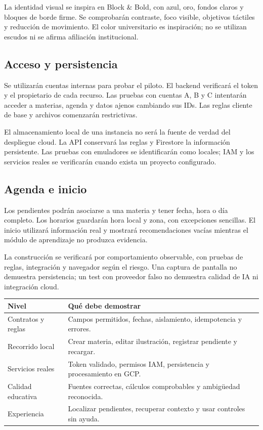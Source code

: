 La identidad visual se inspira en Block \& Bold, con azul, oro, fondos claros y bloques de borde firme. Se comprobarán contraste, foco visible, objetivos táctiles y reducción de movimiento. El color universitario es inspiración; no se utilizan escudos ni se afirma afiliación institucional.

\subsection*{Acceso y persistencia}
Se utilizarán cuentas internas para probar el piloto. El backend verificará el token y el propietario de cada recurso. Las pruebas con cuentas A, B y C intentarán acceder a materias, agenda y datos ajenos cambiando sus IDs. Las reglas cliente de base y archivos comenzarán restrictivas.

El almacenamiento local de una instancia no será la fuente de verdad del despliegue cloud. La API conservará las reglas y Firestore la información persistente. Las pruebas con emuladores se identificarán como locales; IAM y los servicios reales se verificarán cuando exista un proyecto configurado.

\subsection*{Agenda e inicio}
Los pendientes podrán asociarse a una materia y tener fecha, hora o día completo. Los horarios guardarán hora local y zona, con excepciones sencillas. El inicio utilizará información real y mostrará recomendaciones vacías mientras el módulo de aprendizaje no produzca evidencia.

La construcción se verificará por comportamiento observable, con pruebas de reglas, integración y navegador según el riesgo. Una captura de pantalla no demuestra persistencia; un test con proveedor falso no demuestra calidad de IA ni integración cloud.

\begin{tabularx}{\linewidth}{P{3cm}Y}
\toprule
\textbf{Nivel} & \textbf{Qué debe demostrar}\\
\midrule
Contratos y reglas & Campos permitidos, fechas, aislamiento, idempotencia y errores.\\
Recorrido local & Crear materia, editar ilustración, registrar pendiente y recargar.\\
Servicios reales & Token validado, permisos IAM, persistencia y procesamiento en GCP.\\
Calidad educativa & Fuentes correctas, cálculos comprobables y ambigüedad reconocida.\\
Experiencia & Localizar pendientes, recuperar contexto y usar controles sin ayuda.\\
\bottomrule
\end{tabularx}

